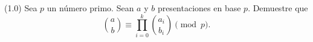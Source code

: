 
(1.0) Sea $p$ un número primo. Sean $a$ y $b$ presentaciones en base $p$.
Demuestre que
\[
  \binom{a}{b} \equiv \prod_{i=0}^{k} \binom{a_i}{b_i} \pmod{p}.
\]
